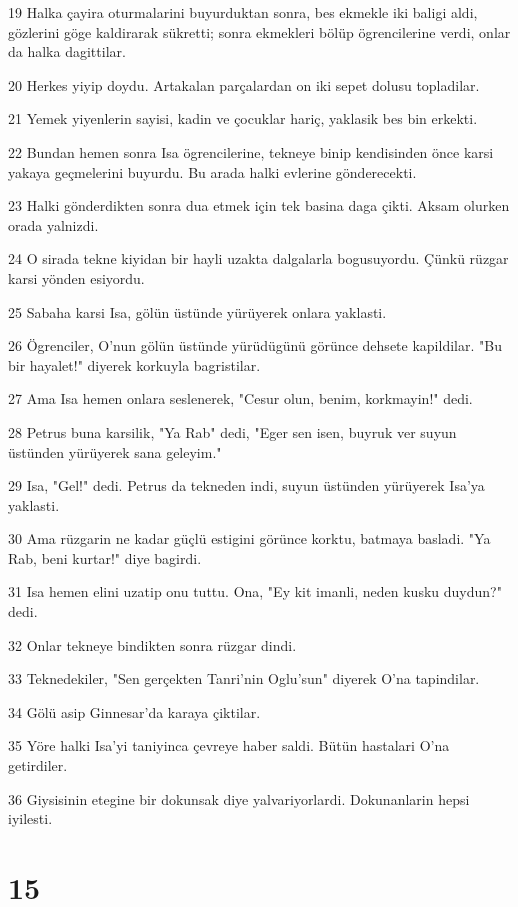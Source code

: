\par 19 Halka çayira oturmalarini buyurduktan sonra, bes ekmekle iki baligi aldi, gözlerini göge kaldirarak sükretti; sonra ekmekleri bölüp ögrencilerine verdi, onlar da halka dagittilar.
\par 20 Herkes yiyip doydu. Artakalan parçalardan on iki sepet dolusu topladilar.
\par 21 Yemek yiyenlerin sayisi, kadin ve çocuklar hariç, yaklasik bes bin erkekti.
\par 22 Bundan hemen sonra Isa ögrencilerine, tekneye binip kendisinden önce karsi yakaya geçmelerini buyurdu. Bu arada halki evlerine gönderecekti.
\par 23 Halki gönderdikten sonra dua etmek için tek basina daga çikti. Aksam olurken orada yalnizdi.
\par 24 O sirada tekne kiyidan bir hayli uzakta dalgalarla bogusuyordu. Çünkü rüzgar karsi yönden esiyordu.
\par 25 Sabaha karsi Isa, gölün üstünde yürüyerek onlara yaklasti.
\par 26 Ögrenciler, O'nun gölün üstünde yürüdügünü görünce dehsete kapildilar. "Bu bir hayalet!" diyerek korkuyla bagristilar.
\par 27 Ama Isa hemen onlara seslenerek, "Cesur olun, benim, korkmayin!" dedi.
\par 28 Petrus buna karsilik, "Ya Rab" dedi, "Eger sen isen, buyruk ver suyun üstünden yürüyerek sana geleyim."
\par 29 Isa, "Gel!" dedi. Petrus da tekneden indi, suyun üstünden yürüyerek Isa'ya yaklasti.
\par 30 Ama rüzgarin ne kadar güçlü estigini görünce korktu, batmaya basladi. "Ya Rab, beni kurtar!" diye bagirdi.
\par 31 Isa hemen elini uzatip onu tuttu. Ona, "Ey kit imanli, neden kusku duydun?" dedi.
\par 32 Onlar tekneye bindikten sonra rüzgar dindi.
\par 33 Teknedekiler, "Sen gerçekten Tanri'nin Oglu'sun" diyerek O'na tapindilar.
\par 34 Gölü asip Ginnesar'da karaya çiktilar.
\par 35 Yöre halki Isa'yi taniyinca çevreye haber saldi. Bütün hastalari O'na getirdiler.
\par 36 Giysisinin etegine bir dokunsak diye yalvariyorlardi. Dokunanlarin hepsi iyilesti.

\chapter{15}

